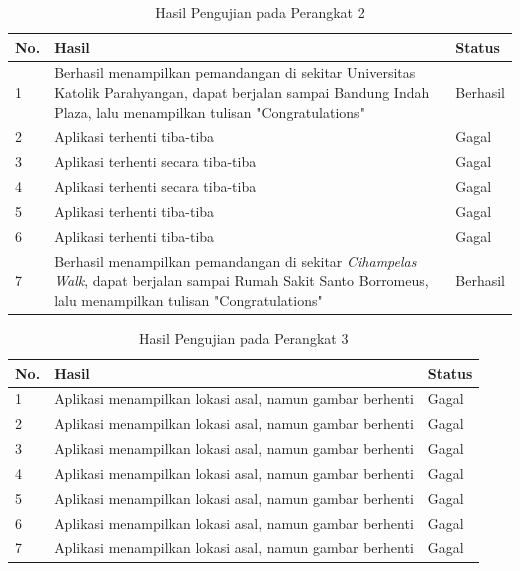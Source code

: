 \begin{table}[]
    \centering
    \caption{Hasil Pengujian pada Perangkat 2}
    \begin{tabular}{|p{1cm}||p{8cm}|p{3cm}|}
    \hline
       No. & Hasil & Status \\
    \hline \hline
        1 & Berhasil menampilkan pemandangan di sekitar Universitas Katolik Parahyangan, dapat berjalan sampai Bandung Indah Plaza, lalu menampilkan tulisan "Congratulations" & Berhasil\\
    \hline
        2 & Aplikasi terhenti tiba-tiba & Gagal \\
    \hline
        3 & Aplikasi terhenti secara tiba-tiba & Gagal \\
        \hline
        4 & Aplikasi terhenti secara tiba-tiba & Gagal \\
        \hline
        5 & Aplikasi terhenti tiba-tiba & Gagal \\
        \hline
        6 & Aplikasi terhenti tiba-tiba & Gagal \\
        \hline 
        7 & Berhasil menampilkan pemandangan di sekitar \textit{Cihampelas Walk}, dapat berjalan sampai Rumah Sakit Santo Borromeus, lalu menampilkan tulisan "Congratulations" & Berhasil\\
        \hline
    \end{tabular}
    \label{tab:test-hardware-two}
\end{table} 

\begin{table}[]
    \centering
    \caption{Hasil Pengujian pada Perangkat 3}
    \begin{tabular}{|p{1cm}||p{8cm}|p{3cm}|}
    \hline
       No. & Hasil & Status \\
    \hline \hline
        1 & Aplikasi menampilkan lokasi asal, namun gambar berhenti & Gagal\\
    \hline
        2 & Aplikasi menampilkan lokasi asal, namun gambar berhenti & Gagal \\
    \hline
        3 & Aplikasi menampilkan lokasi asal, namun gambar berhenti & Gagal \\
        \hline
        4 & Aplikasi menampilkan lokasi asal, namun gambar berhenti & Gagal \\
        \hline
        5 & Aplikasi menampilkan lokasi asal, namun gambar berhenti & Gagal \\
        \hline
        6 & Aplikasi menampilkan lokasi asal, namun gambar berhenti & Gagal \\
        \hline
        7 & Aplikasi menampilkan lokasi asal, namun gambar berhenti & Gagal \\ 
        \hline
    \end{tabular}
    \label{tab:test-hardware-three}
\end{table}

